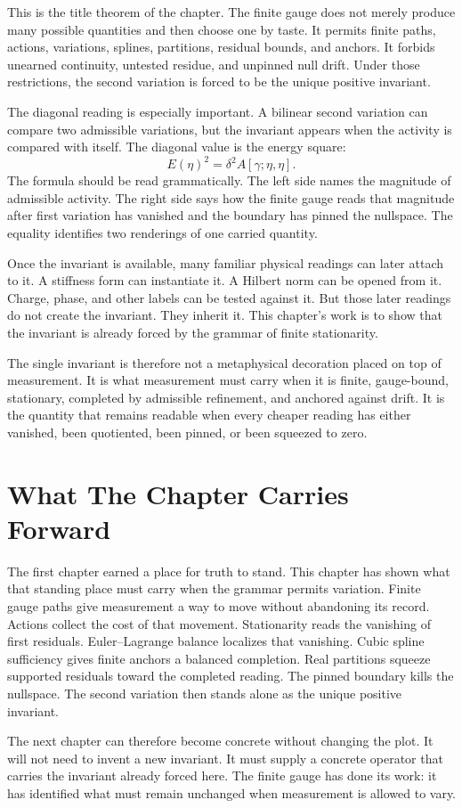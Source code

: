 This is the title theorem of the chapter. The finite gauge does not merely
produce many possible quantities and then choose one by taste. It permits
finite paths, actions, variations, splines, partitions, residual bounds, and
anchors. It forbids unearned continuity, untested residue, and unpinned
null drift. Under those restrictions, the second variation is forced to be
the unique positive invariant.

The diagonal reading is especially important. A bilinear second variation
can compare two admissible variations, but the invariant appears when the
activity is compared with itself. The diagonal value is the energy square:
\[
  E(\eta)^2 = \delta^2 A[\gamma;\eta,\eta].
\]
The formula should be read grammatically. The left side names the magnitude
of admissible activity. The right side says how the finite gauge reads that
magnitude after first variation has vanished and the boundary has pinned
the nullspace. The equality identifies two renderings of one carried
quantity.

Once the invariant is available, many familiar physical readings can later
attach to it. A stiffness form can instantiate it. A Hilbert norm can be
opened from it. Charge, phase, and other labels can be tested against it.
But those later readings do not create the invariant. They inherit it. This
chapter's work is to show that the invariant is already forced by the
grammar of finite stationarity.

The single invariant is therefore not a metaphysical decoration placed on
top of measurement. It is what measurement must carry when it is finite,
gauge-bound, stationary, completed by admissible refinement, and anchored
against drift. It is the quantity that remains readable when every cheaper
reading has either vanished, been quotiented, been pinned, or been squeezed
to zero.

\section{What The Chapter Carries Forward}

The first chapter earned a place for truth to stand. This chapter has shown
what that standing place must carry when the grammar permits variation.
Finite gauge paths give measurement a way to move without abandoning its
record. Actions collect the cost of that movement. Stationarity reads the
vanishing of first residuals. Euler--Lagrange balance localizes that
vanishing. Cubic spline sufficiency gives finite anchors a balanced
completion. Real partitions squeeze supported residuals toward the completed
reading. The pinned boundary kills the nullspace. The second variation then
stands alone as the unique positive invariant.

The next chapter can therefore become concrete without changing the plot.
It will not need to invent a new invariant. It must supply a concrete
operator that carries the invariant already forced here. The finite gauge
has done its work: it has identified what must remain unchanged when
measurement is allowed to vary.
